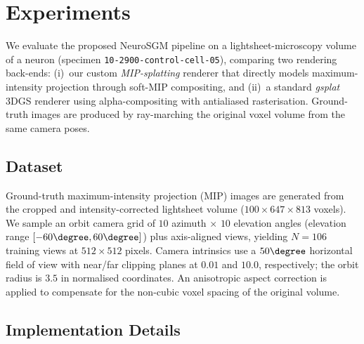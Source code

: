 
\section{Experiments}
\label{sec:experiments}

We evaluate the proposed NeuroSGM pipeline on a lightsheet-microscopy
volume of a neuron (specimen \texttt{10-2900-control-cell-05}), comparing
two rendering back-ends: (i)~our custom \emph{MIP-splatting} renderer
that directly models maximum-intensity projection through soft-MIP
compositing, and (ii)~a standard \emph{gsplat} 3DGS renderer using
alpha-compositing with antialiased rasterisation.
Ground-truth images are produced by ray-marching the original voxel
volume from the same camera poses.

\subsection{Dataset}
\label{sec:exp-dataset}

Ground-truth maximum-intensity projection (MIP) images are generated
from the cropped and intensity-corrected lightsheet volume
($100\times647\times813$ voxels).
We sample an orbit camera grid of
$10$ azimuth $\times$ $10$ elevation angles
(elevation range $[-60\degree,60\degree]$) plus axis-aligned views,
yielding $N=106$ training views at $512\times512$ pixels.
Camera intrinsics use a $50\degree$ horizontal field of view with
near/far clipping planes at $0.01$ and $10.0$, respectively;
the orbit radius is $3.5$ in normalised coordinates.
An anisotropic aspect correction is applied to compensate for the
non-cubic voxel spacing of the original volume.

\subsection{Implementation Details}
\label{sec:exp-implementation}

